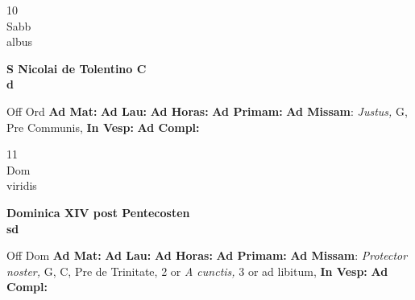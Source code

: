 \documentclass[10pt, openany]{book}
\begin{document}
    \begin{center}
        \begin{minipage}{3.5in}
            \vspace{2em}
            \begin{minipage}{0.5in}
                {\Huge 10} \\
                {\normalsize Sabb} \\
                {\normalsize albus}
            \end{minipage}
            \begin{minipage}{3.0in}
                \textbf{ \large S Nicolai de Tolentino C \\
                \textnormal{\normalsize d}} \\ 
            \end{minipage}
            \begin{justify}Off Ord
                \textbf{Ad Mat: }
                \textbf{Ad Lau: }
                \textbf{Ad Horas: }
                \textbf{Ad Primam: }\textbf{Ad Missam}: \textit{Justus,} G, Pre Communis,  
                \textbf{In Vesp: }
                \textbf{Ad Compl: }
            \end{justify}
        \end{minipage}
    \end{center}

    \begin{center}
        \begin{minipage}{3.5in}
            \vspace{2em}
            \begin{minipage}{0.5in}
                {\Huge 11} \\
                {\normalsize Dom} \\
                {\normalsize viridis}
            \end{minipage}
            \begin{minipage}{3.0in}
                \textbf{ \large Dominica XIV post Pentecosten \\
                \textnormal{\normalsize sd}} \\ 
            \end{minipage}
            \begin{justify}Off Dom
                \textbf{Ad Mat: }
                \textbf{Ad Lau: }
                \textbf{Ad Horas: }
                \textbf{Ad Primam: }\textbf{Ad Missam}: \textit{Protector noster,} G, C, Pre de Trinitate, 2 or \textit{A cunctis,} 3 or ad libitum,  
                \textbf{In Vesp: }
                \textbf{Ad Compl: }
            \end{justify}
        \end{minipage}
    \end{center}
\end{document}
